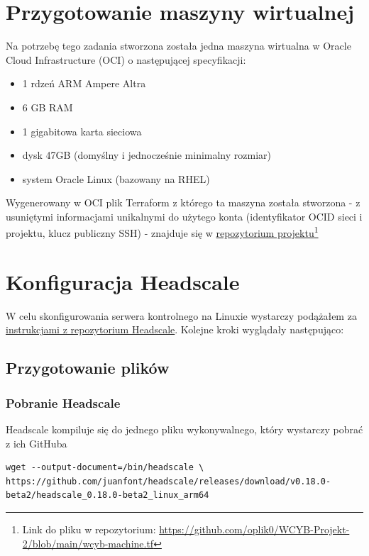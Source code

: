 \documentclass{report}
\numberwithin{equation}{section}
\begin{document}
\section{Przygotowanie maszyny wirtualnej}
Na potrzebę tego zadania stworzona została jedna maszyna wirtualna w Oracle Cloud Infrastructure (OCI) o następującej specyfikacji:
\begin{itemize}
    \item 1 rdzeń ARM Ampere Altra
    \item 6 GB RAM
    \item 1 gigabitowa karta sieciowa
    \item dysk 47GB (domyślny i jednocześnie minimalny rozmiar)
    \item system Oracle Linux (bazowany na RHEL)
\end{itemize}
Wygenerowany w OCI plik Terraform z którego ta maszyna została stworzona - z usuniętymi informacjami unikalnymi do użytego konta (identyfikator OCID sieci i projektu, klucz publiczny SSH) - znajduje się w \href{https://github.com/oplik0/WCYB-Projekt-2}{repozytorium projektu}\footnote{Link do pliku w repozytorium: \url{https://github.com/oplik0/WCYB-Projekt-2/blob/main/wcyb-machine.tf}}

\section{Konfiguracja Headscale}

W celu skonfigurowania serwera kontrolnego na Linuxie wystarczy podążałem za \href{https://github.com/juanfont/headscale/blob/main/docs/running-headscale-linux.md}{instrukcjami z repozytorium Headscale}. Kolejne kroki wyglądały następująco:

\subsection{Przygotowanie plików}

\subsubsection{Pobranie Headscale}

Headscale kompiluje się do jednego pliku wykonywalnego, który wystarczy pobrać z  ich GitHuba

\begin{verbatim}
wget --output-document=/bin/headscale \
https://github.com/juanfont/headscale/releases/download/v0.18.0-beta2/headscale_0.18.0-beta2_linux_arm64
\end{verbatim}
\end{document}
